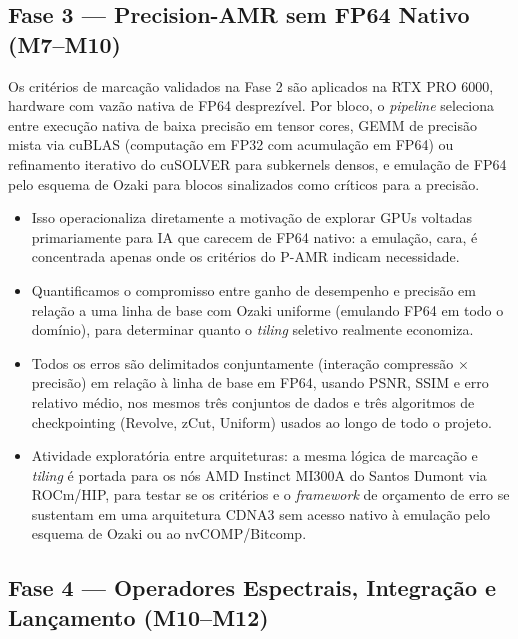 \documentclass[12pt,a4paper]{article}
\newcommand{\pamr}{P\nobreakdash-AMR}
\begin{document}
\subsection{Fase 3 --- Precision-AMR sem FP64 Nativo (M7--M10)}

Os critérios de marcação validados na Fase 2 são aplicados na RTX PRO 6000,
hardware com vazão nativa de FP64 desprezível. Por bloco, o \emph{pipeline}
seleciona entre execução nativa de baixa precisão em tensor cores, GEMM de
precisão mista via cuBLAS (computação em FP32 com acumulação em FP64) ou
refinamento iterativo do cuSOLVER para subkernels densos, e emulação de FP64
pelo esquema de Ozaki para blocos sinalizados como críticos para a precisão.

\begin{itemize}
  \item Isso operacionaliza diretamente a motivação de explorar GPUs
        voltadas primariamente para IA que carecem de FP64 nativo: a
        emulação, cara, é concentrada apenas onde os critérios do \pamr{}
        indicam necessidade.
  \item Quantificamos o compromisso entre ganho de desempenho e precisão em
        relação a uma linha de base com Ozaki uniforme (emulando FP64 em todo
        o domínio), para determinar quanto o \emph{tiling} seletivo realmente
        economiza.
  \item Todos os erros são delimitados conjuntamente (interação
        compressão $\times$ precisão) em relação à linha de base em FP64,
        usando PSNR, SSIM e erro relativo médio, nos mesmos três conjuntos de
        dados e três algoritmos de checkpointing (Revolve, zCut, Uniform)
        usados ao longo de todo o projeto.
  \item Atividade exploratória entre arquiteturas: a mesma lógica de marcação
        e \emph{tiling} é portada para os nós AMD Instinct MI300A do Santos
        Dumont via ROCm/HIP, para testar se os critérios e o \emph{framework}
        de orçamento de erro se sustentam em uma arquitetura CDNA3 sem acesso
        nativo à emulação pelo esquema de Ozaki ou ao nvCOMP/Bitcomp.
\end{itemize}

\subsection{Fase 4 --- Operadores Espectrais, Integração e Lançamento
(M10--M12)}
\end{document}
